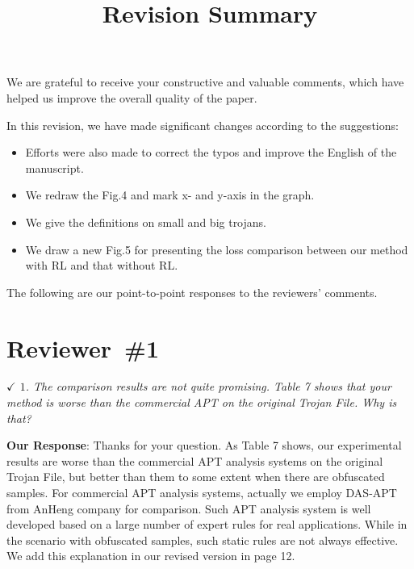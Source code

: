 \documentclass{amsart}
\theoremstyle{definition}
\theoremstyle{remark}
\numberwithin{equation}{section}
\begin{document}
%

\setlength{\parskip}{.5cm}

\title[Revision Summary]
{Revision Summary}%

\maketitle

We are grateful to receive your constructive and valuable comments,
which have helped us improve the overall quality of the paper.

In this revision,
we have made significant changes according to the suggestions:

\begin{itemize}
\item Efforts were also made to correct the typos and improve the English of the manuscript.
\item We redraw the Fig.4 and mark x- and y-axis in the graph.
\item We give the definitions on small and big trojans.
\item We draw a new Fig.5 for presenting the loss comparison between our method with RL and that without RL.

\end{itemize}

The following are our point-to-point responses to the reviewers’ comments.



\section*{Reviewer~\#1}
\emph{$\checkmark$ $1$. The comparison results are not quite promising. Table 7 shows that your method is worse than the commercial APT on the original Trojan File. Why is that?}

\textbf{Our Response}:
Thanks for your question.
As Table 7 shows, our experimental results are worse than the commercial APT analysis systems on the original Trojan File, but better than them to some extent when there are obfuscated samples. For commercial APT analysis systems, actually we employ DAS-APT from AnHeng company for comparison. Such APT analysis system is well developed based on a large number of expert rules for real applications. While in the scenario with obfuscated samples, such static rules are not always effective. We add this explanation in our revised version in page 12.
\end{document}
